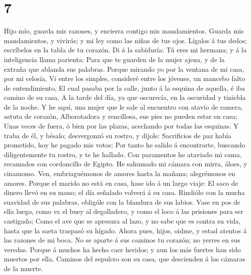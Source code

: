 \hypertarget{section-6}{%
\section{7}\label{section-6}}

 Hijo mío, guarda mis razones, y encierra contigo mis
mandamientos.  Guarda mis mandamientos, y vivirás; y mi
ley como las niñas de tus ojos.  Lígalos á tus dedos;
escríbelos en la tabla de tu corazón.  Di á la sabiduría:
Tú eres mi hermana; y á la inteligencia llama parienta: 
Para que te guarden de la mujer ajena, y de la extraña que ablanda sus
palabras.  Porque mirando yo por la ventana de mi casa,
por mi celosía,  Vi entre los simples, consideré entre los
jóvenes, un mancebo falto de entendimiento,  El cual
pasaba por la calle, junto á la esquina de aquella, é iba camino de su
casa,  A la tarde del día, ya que oscurecía, en la
oscuridad y tiniebla de la noche.  Y he aquí, una mujer
que le sale al encuentro con atavío de ramera, astuta de corazón,
 Alborotadora y rencillosa, sus pies no pueden estar en
casa;  Unas veces de fuera, ó bien por las plazas,
acechando por todas las esquinas.  Y traba de él, y
bésalo; desvergonzó su rostro, y díjole:  Sacrificios de
paz había prometido, hoy he pagado mis votos;  Por tanto
he salido á encontrarte, buscando diligentemente tu rostro, y te he
hallado.  Con paramentos he ataviado mi cama, recamados
con cordoncillo de Egipto.  He sahumado mi cámara con
mirra, áloes, y cinamomo.  Ven, embriaguémonos de amores
hasta la mañana; alegrémonos en amores.  Porque el marido
no está en casa, hase ido á un largo viaje:  El saco de
dinero llevó en su mano; el día señalado volverá á su casa.
 Rindiólo con la mucha suavidad de sus palabras, obligóle
con la blandura de sus labios.  Vase en pos de ella
luego, como va el buey al degolladero, y como el loco á las prisiones
para ser castigado;  Como el ave que se apresura al lazo,
y no sabe que es contra su vida, hasta que la saeta traspasó su hígado.
 Ahora pues, hijos, oidme, y estad atentos á las razones
de mi boca.  No se aparte á sus caminos tu corazón; no
yerres en sus veredas.  Porque á muchos ha hecho caer
heridos; y aun los más fuertes han sido muertos por ella.
 Caminos del sepulcro son su casa, que descienden á las
cámaras de la muerte.

